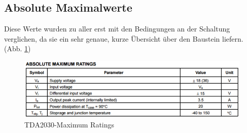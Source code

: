\subsection{Absolute Maximalwerte}\label{subsec:3.2.1}
Diese Werte wurden zu aller erst mit den Bedingungen an der Schaltung verglichen, da sie ein sehr genaue, kurze Übersicht über den Baustein liefern. (Abb. \ref{fig:3.2.1.1})
\begin{figure} [H]
	\centering
	\includegraphics[width=1\textwidth]{img/Grundlagen/TDA2030/TDA2030MaximumRatings.PNG}
	\caption[TDA2030-Maximum Ratings]{TDA2030-Maximum Ratings\footnotemark}
	\label {fig:3.2.1.1}
\end{figure}

